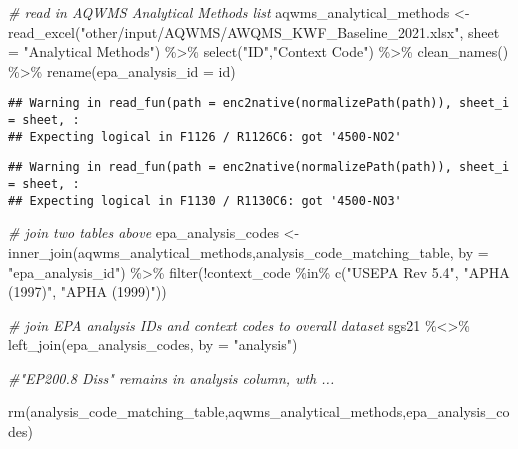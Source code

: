 \documentclass[
]{book}
\newenvironment{Shaded}{\begin{snugshade}}{\end{snugshade}}
\newcommand{\AttributeTok}[1]{\textcolor[rgb]{0.77,0.63,0.00}{#1}}
\newcommand{\CommentTok}[1]{\textcolor[rgb]{0.56,0.35,0.01}{\textit{#1}}}
\newcommand{\FunctionTok}[1]{\textcolor[rgb]{0.00,0.00,0.00}{#1}}
\newcommand{\NormalTok}[1]{#1}
\newcommand{\OtherTok}[1]{\textcolor[rgb]{0.56,0.35,0.01}{#1}}
\newcommand{\SpecialCharTok}[1]{\textcolor[rgb]{0.00,0.00,0.00}{#1}}
\newcommand{\StringTok}[1]{\textcolor[rgb]{0.31,0.60,0.02}{#1}}
\begin{document}
\begin{Shaded}
\begin{Highlighting}[]
\CommentTok{\# read in AQWMS Analytical Methods list}
\NormalTok{aqwms\_analytical\_methods }\OtherTok{\textless{}{-}} \FunctionTok{read\_excel}\NormalTok{(}\StringTok{"other/input/AQWMS/AWQMS\_KWF\_Baseline\_2021.xlsx"}\NormalTok{, }\AttributeTok{sheet =} \StringTok{"Analytical Methods"}\NormalTok{) }\SpecialCharTok{\%\textgreater{}\%}
  \FunctionTok{select}\NormalTok{(}\StringTok{"ID"}\NormalTok{,}\StringTok{"Context Code"}\NormalTok{) }\SpecialCharTok{\%\textgreater{}\%}
  \FunctionTok{clean\_names}\NormalTok{() }\SpecialCharTok{\%\textgreater{}\%}
  \FunctionTok{rename}\NormalTok{(}\AttributeTok{epa\_analysis\_id =}\NormalTok{ id) }
\end{Highlighting}
\end{Shaded}

\begin{verbatim}
## Warning in read_fun(path = enc2native(normalizePath(path)), sheet_i = sheet, :
## Expecting logical in F1126 / R1126C6: got '4500-NO2'
\end{verbatim}

\begin{verbatim}
## Warning in read_fun(path = enc2native(normalizePath(path)), sheet_i = sheet, :
## Expecting logical in F1130 / R1130C6: got '4500-NO3'
\end{verbatim}

\begin{Shaded}
\begin{Highlighting}[]
\CommentTok{\# join two tables above}
\NormalTok{epa\_analysis\_codes }\OtherTok{\textless{}{-}} \FunctionTok{inner\_join}\NormalTok{(aqwms\_analytical\_methods,analysis\_code\_matching\_table, }\AttributeTok{by =} \StringTok{"epa\_analysis\_id"}\NormalTok{) }\SpecialCharTok{\%\textgreater{}\%}
  \FunctionTok{filter}\NormalTok{(}\SpecialCharTok{!}\NormalTok{context\_code }\SpecialCharTok{\%in\%} \FunctionTok{c}\NormalTok{(}\StringTok{"USEPA Rev 5.4"}\NormalTok{,}
                              \StringTok{"APHA (1997)"}\NormalTok{,}
                              \StringTok{"APHA (1999)"}\NormalTok{)) }

\CommentTok{\# join EPA analysis IDs and context codes to overall dataset}
\NormalTok{sgs21 }\SpecialCharTok{\%\textless{}\textgreater{}\%}
  \FunctionTok{left\_join}\NormalTok{(epa\_analysis\_codes, }\AttributeTok{by =} \StringTok{"analysis"}\NormalTok{)}

\CommentTok{\#"EP200.8 Diss" remains in analysis column, wth ...}

\FunctionTok{rm}\NormalTok{(analysis\_code\_matching\_table,aqwms\_analytical\_methods,epa\_analysis\_codes)}
\end{Highlighting}
\end{Shaded}
\end{document}
